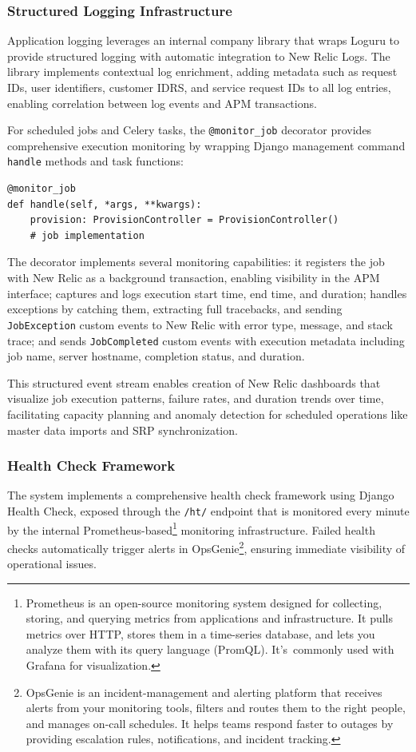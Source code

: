 \subsubsection{Structured Logging Infrastructure}

Application logging leverages an internal company library that wraps Loguru to provide structured logging with automatic integration to New Relic Logs. The library implements contextual log enrichment, adding metadata such as request IDs, user identifiers, customer IDRS, and service request IDs to all log entries, enabling correlation between log events and APM transactions.

For scheduled jobs and Celery tasks, the \texttt{@monitor\_job} decorator provides comprehensive execution monitoring by wrapping Django management command \texttt{handle} methods and task functions:

\begin{verbatim}
@monitor_job
def handle(self, *args, **kwargs):
    provision: ProvisionController = ProvisionController()
    # job implementation
\end{verbatim}

The decorator implements several monitoring capabilities: it registers the job with New Relic as a background transaction, enabling visibility in the APM interface; captures and logs execution start time, end time, and duration; handles exceptions by catching them, extracting full tracebacks, and sending \texttt{JobException} custom events to New Relic with error type, message, and stack trace; and sends \texttt{JobCompleted} custom events with execution metadata including job name, server hostname, completion status, and duration.

This structured event stream enables creation of New Relic dashboards that visualize job execution patterns, failure rates, and duration trends over time, facilitating capacity planning and anomaly detection for scheduled operations like master data imports and SRP synchronization.

\subsubsection{Health Check Framework}

The system implements a comprehensive health check framework using Django Health Check, exposed through the \texttt{/ht/} endpoint that is monitored every minute by the internal Prometheus-based\footnote{Prometheus is an open-source monitoring system designed for collecting, storing, and querying metrics from applications and infrastructure. It pulls metrics over HTTP, stores them in a time-series database, and lets you analyze them with its query language (PromQL). It's~commonly used with Grafana for visualization.} monitoring infrastructure. Failed health checks automatically trigger alerts in OpsGenie\footnote{OpsGenie is an incident-management and alerting platform that receives alerts from your monitoring tools, filters and routes them to the right people, and manages on-call schedules. It helps teams respond faster to outages by providing escalation rules, notifications, and incident tracking.}, ensuring immediate visibility of operational issues.

